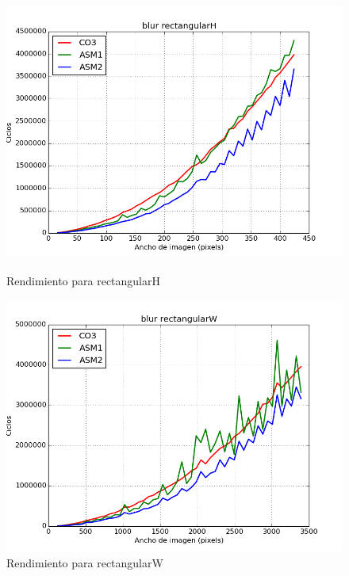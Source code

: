 \documentclass[a4paper]{article}
\begin{document}
\begin{figure}[H]
	\begin{center}
		\includegraphics[scale=0.4]{../tp2-bundle.v2/Testing/plots/noCO0/blur-rectangularH--noCO0.png}
		\caption{Rendimiento para rectangularH}
		\label{fig:blurRH}
	\end{center}
	\endminipage\hfill
	\begin{center}
		\includegraphics[scale=0.4]{../tp2-bundle.v2/Testing/plots/noCO0/blur-rectangularW--noCO0.png}
		\caption{Rendimiento para rectangularW}
		\label{fig:blurRW}
	\end{center}
	\endminipage\hfill
\end{figure}
\end{document}

